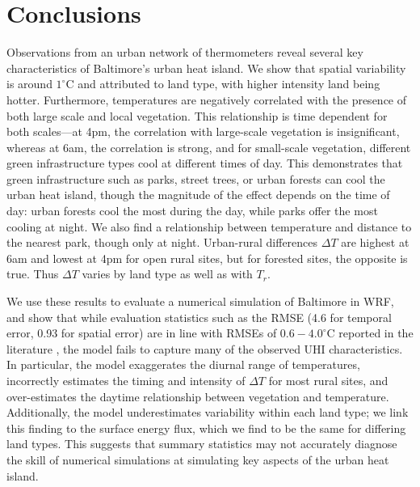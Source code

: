 \documentclass[draft,linenumbers]{agujournal}
\begin{document}
\section{Conclusions}\label{sec:conclusions}
Observations from an urban network of thermometers reveal several key characteristics of Baltimore's urban heat island. We show that spatial variability is around $1^\circ$C and attributed to land type, with higher intensity land being hotter. 
Furthermore, temperatures are negatively correlated with the presence of both large scale and local vegetation. This relationship is time dependent for both scales---at 4pm, the correlation with large-scale vegetation is insignificant, whereas at 6am, the correlation is strong, and for small-scale vegetation, different green infrastructure types cool at different times of day.  
This demonstrates that green infrastructure such as parks, street trees, or urban forests can cool the urban heat island, though the magnitude of the effect depends on the time of day: urban forests cool the most during the day, while parks offer the most cooling at night. 
We also find a relationship between temperature and distance to the nearest park, though only at night.
 Urban-rural differences $\Delta T$ are highest at 6am and lowest at 4pm for open rural sites, but for forested sites, the opposite is true. Thus $\Delta T$ varies by land type as well as with $T_r$.

 We use these results to evaluate a numerical simulation of Baltimore in WRF, and show that while evaluation statistics such as the RMSE (4.6 for temporal error, 0.93 for spatial error) are in line with RMSEs of $0.6-4.0^\circ$C reported in the literature  \citep{kim2013evaluation}, the model fails to capture many of the observed UHI characteristics. In particular, the model exaggerates the diurnal range of temperatures, incorrectly estimates the timing and intensity of $\Delta T$ for most rural sites, and over-estimates the daytime relationship between vegetation and temperature. 
 Additionally, the model underestimates variability within each land type;%
 we link this finding to the surface energy flux, which we find to be the same for differing land types. This suggests that summary statistics may not accurately diagnose the skill of numerical simulations at simulating key aspects of the urban heat island. 
\end{document}
